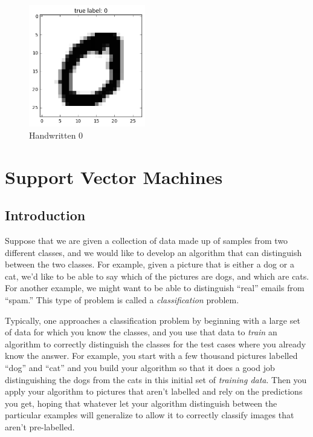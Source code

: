 \documentclass[
  oneside]{scrbook}
\begin{document}
\begin{figure}
\hypertarget{fig:mnist0}{%
\centering
\includegraphics[width=2in,height=\textheight]{img/mnist_data_10_0.png}
\caption{Handwritten 0}\label{fig:mnist0}
}
\end{figure}

\hypertarget{support-vector-machines}{%
\chapter{Support Vector Machines}\label{support-vector-machines}}

\hypertarget{introduction-3}{%
\section{Introduction}\label{introduction-3}}

Suppose that we are given a collection of data made up of samples from
two different classes, and we would like to develop an algorithm that
can distinguish between the two classes. For example, given a picture
that is either a dog or a cat, we'd like to be able to say which of the
pictures are dogs, and which are cats. For another example, we might
want to be able to distinguish ``real'' emails from ``spam.'' This type
of problem is called a \emph{classification} problem.

Typically, one approaches a classification problem by beginning with a
large set of data for which you know the classes, and you use that data
to \emph{train} an algorithm to correctly distinguish the classes for
the test cases where you already know the answer. For example, you start
with a few thousand pictures labelled ``dog'' and ``cat'' and you build
your algorithm so that it does a good job distinguishing the dogs from
the cats in this initial set of \emph{training data}. Then you apply
your algorithm to pictures that aren't labelled and rely on the
predictions you get, hoping that whatever let your algorithm distinguish
between the particular examples will generalize to allow it to correctly
classify images that aren't pre-labelled.
\end{document}
